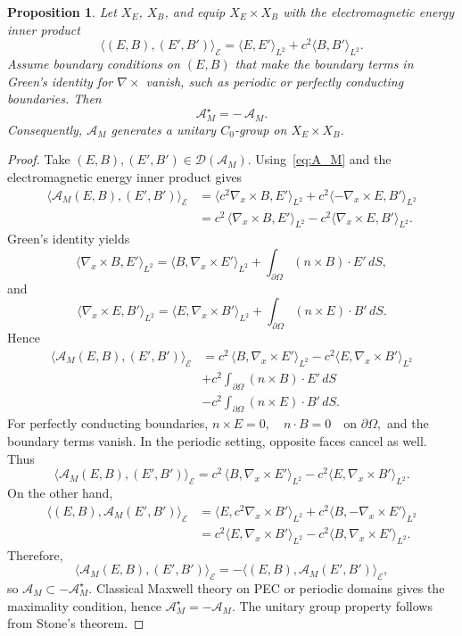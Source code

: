 \documentclass[10pt,a4paper]{amsart}
\newtheorem{proposition}{Proposition}
\begin{document}
\begin{proposition}
\label{prop:AM-skew}
Let $X_E$, $X_B$, and equip $X_E\times X_B$ with the electromagnetic energy inner product
\[
\langle (E,B),(E',B')\rangle_{\mathcal E}
=
\langle E,E'\rangle_{L^2}
+
c^2\langle B,B'\rangle_{L^2}.
\]
Assume boundary conditions on $(E,B)$ that make the boundary terms in Green's identity for $\nabla\times$ vanish, such as periodic or perfectly conducting boundaries. Then
\[
\mathcal{A}_M^{\star}=-\,\mathcal{A}_M .
\]
Consequently, $\mathcal{A}_M$ generates a unitary $C_0$-group on $X_E\times X_B$.
\end{proposition}

\begin{proof}
Take $(E,B),(E',B')\in\mathcal{D}(\mathcal{A}_M)$.  
Using~\eqref{eq:A_M} and the electromagnetic energy inner product gives
\begin{align*}
\big\langle \mathcal{A}_M(E,B),(E',B')\big\rangle_{\mathcal E}
&=
\langle c^{2}\nabla_x\times B, E'\rangle_{L^{2}}
+
c^2\langle -\nabla_x\times E, B'\rangle_{L^{2}}\\
&=
c^{2}\,\langle \nabla_x\times B, E'\rangle_{L^{2}}
-
c^2\langle \nabla_x\times E, B'\rangle_{L^{2}} .
\end{align*}
Green's identity yields
\[
\langle \nabla_x\times B , E' \rangle_{L^{2}}
=
\langle B , \nabla_x\times E' \rangle_{L^{2}}
+
\int_{\partial\Omega} (n\times B)\!\cdot E'\, dS,
\]
and
\[
\langle \nabla_x\times E , B' \rangle_{L^{2}}
=
\langle E , \nabla_x\times B' \rangle_{L^{2}}
+
\int_{\partial\Omega} (n\times E)\!\cdot B'\, dS .
\]
Hence
\begin{align*}
\big\langle \mathcal{A}_M(E,B),(E',B')\big\rangle_{\mathcal E}
&=
c^{2}\,\langle B,\nabla_x\times E' \rangle_{L^{2}}
-
c^2\langle E,\nabla_x\times B' \rangle_{L^{2}}\\ 
&+
c^{2}\!\int_{\partial\Omega} (n\times B)\!\cdot E'\,dS\\
&-
c^2\!\int_{\partial\Omega} (n\times E)\!\cdot B'\,dS .
\end{align*}
For perfectly conducting boundaries,
\(
n\times E =0,\quad n\cdot B=0
\quad\text{on }\partial\Omega,
\)
and the boundary terms vanish. In the periodic setting, opposite faces cancel as well. Thus
\[
\big\langle \mathcal{A}_M(E,B),(E',B')\big\rangle_{\mathcal E}
=
c^{2}\,\langle B,\nabla_x\times E' \rangle_{L^{2}}
-
c^2\langle E,\nabla_x\times B' \rangle_{L^{2}} .
\]
On the other hand,
\begin{align*}
\big\langle (E,B), \mathcal{A}_M(E',B') \big\rangle_{\mathcal E}
&=
\langle E,c^2\nabla_x\times B' \rangle_{L^{2}}
+
c^2\langle B,-\nabla_x\times E' \rangle_{L^{2}}\\
&=
c^2\langle E,\nabla_x\times B' \rangle_{L^{2}}
-
c^2\langle B,\nabla_x\times E' \rangle_{L^{2}} .
\end{align*}
Therefore,
\[
\big\langle \mathcal{A}_M(E,B),(E',B')\big\rangle_{\mathcal E}
=
-\big\langle (E,B),\mathcal{A}_M(E',B')\big\rangle_{\mathcal E},
\]
so $\mathcal{A}_M\subset -\mathcal{A}_M^\star$.
Classical Maxwell theory on PEC or periodic domains gives the maximality condition, hence $\mathcal{A}_M^\star=-\mathcal{A}_M$.
The unitary group property follows from Stone's theorem.
\end{proof}
\end{document}
